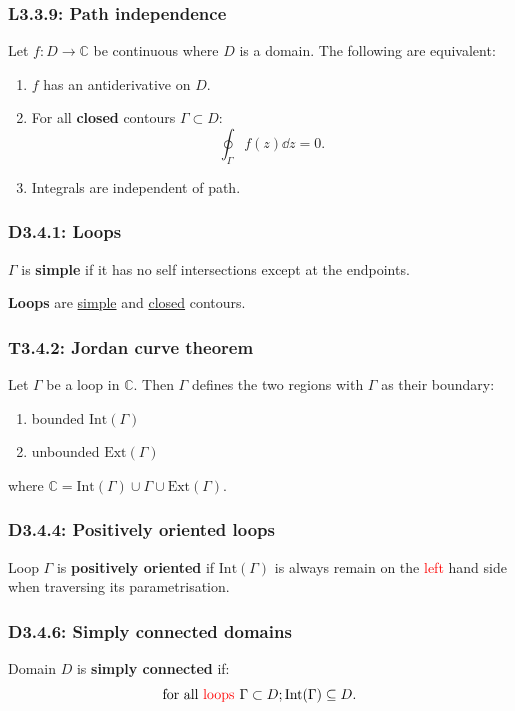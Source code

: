 \documentclass{article}
\begin{document}
\begin{multicols*}{3}
\subsubsection*{L3.3.9: Path independence}
Let $f:D\rightarrow\mathbb{C}$ be continuous where
$D$ is a domain. The following are equivalent:
\begin{enumerate}
    \item $f$ has an antiderivative on $D$.
    \item For all \textbf{closed} contours $\Gamma\subset D$:
    $$\oint_{\Gamma}f(z)\dd z=0.$$

    \item Integrals are independent of path.
\end{enumerate}

\subsubsection*{D3.4.1: Loops}
$\Gamma$ is \textbf{simple} if it has no self intersections
except at the endpoints.

\textbf{Loops} are \underline{simple} and
\underline{closed} contours.

\subsubsection*{T3.4.2: Jordan curve theorem}
Let $\Gamma$ be a loop in $\mathbb{C}$. Then $\Gamma$ defines 
the two regions with $\Gamma$ as their boundary:
\begin{enumerate}
    \item bounded $\text{Int}(\Gamma)$
    \item unbounded $\text{Ext}(\Gamma)$
\end{enumerate}
where $\mathbb{C}=\text{Int}(\Gamma)\cup\Gamma
\cup\text{Ext}(\Gamma)$.

\subsubsection*{D3.4.4: Positively oriented loops}
Loop $\Gamma$ is \textbf{positively oriented} if
$\text{Int}(\Gamma)$ is always remain on the \textcolor{red}{left} 
hand side when traversing its parametrisation.

\subsubsection*{D3.4.6: Simply connected domains}
Domain $D$ is \textbf{simply connected} if: 
$$\text{for all \textcolor{red}{loops}}\hspace{0.05in}
\Gamma\subset D;\text{Int}(\Gamma)\subseteq D.$$


\end{multicols*}
\end{document}

